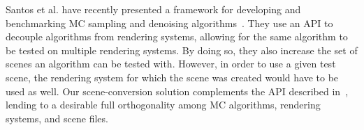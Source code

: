 Santos et al. have recently presented a framework for developing and benchmarking MC sampling and denoising algorithms~\cite{Santos:2018:FBKSD}.
They use an API to decouple algorithms from rendering systems, allowing for the same algorithm to be tested on multiple rendering systems. By doing so, they also increase the set of scenes an algorithm can be tested with. However, in order to use a given test scene, the rendering system for which the scene was created would have to be used as well. Our scene-conversion solution complements the API described in~\cite{Santos:2018:FBKSD}, lending to a desirable full orthogonality among MC algorithms, rendering systems, and scene files.

%
%


